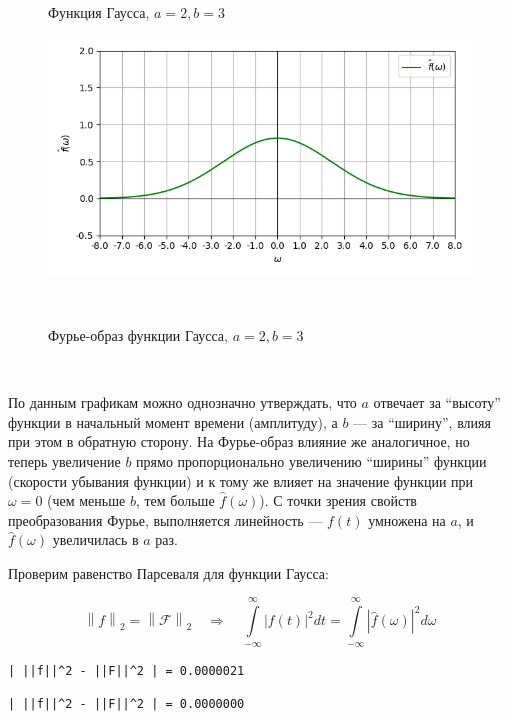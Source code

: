 \documentclass[a4paper]{article}
\let\oldint\int
\def\int{\oldint\limits}
\begin{document}
\begin{figure}[H]
\begin{minipage}{0.5\textwidth}
        \caption{Функция Гаусса, $a = 2, b = 3$}
    \end{minipage}\hfill
    \begin{minipage}{0.5\textwidth}
        \centering \includegraphics[width=\textwidth]{gaussian/real_fourier_2_3.png}
        \caption{Фурье-образ функции Гаусса, $a = 2, b = 3$}
    \end{minipage}\\[1em]
\end{figure}\noindent\

По данным графикам можно однозначно утверждать, что $a$ отвечает за ``высоту'' функции в начальный момент времени (амплитуду), а $b$ --- за ``ширину'', влияя при этом в обратную сторону. На Фурье-образ влияние же аналогичное, но теперь увеличение $b$ прямо пропорционально увеличению ``ширины'' функции (скорости убывания функции) и к тому же влияет на значение функции при $\omega=0$ (чем меньше $b$, тем больше $\hat{f}(\omega)$). С точки зрения свойств преобразования Фурье, выполняется линейность --- $f(t)$ умножена на $a$, и $\hat{f}(\omega)$ увеличилась в $a$ раз.\

Проверим равенство Парсеваля для функции Гаусса:

$$\left\lVert f \right\rVert _2 = \left\lVert \mathcal{F} \right\rVert _2 \quad\Rightarrow\quad \int_{-\infty}^{\infty}\left\lvert f(t)\right\rvert^2dt = \int_{-\infty}^{\infty}\left\lvert \hat{f}(\omega)\right\rvert^2d\omega$$

\begin{lstlisting}[caption={Равенство Парсеваля при $a = 1, b = 1$}, numbers=none]
| ||f||^2 - ||F||^2 | = 0.0000021
\end{lstlisting}

\begin{lstlisting}[caption={Равенство Парсеваля при $a = 1, b = 3$}, numbers=none]
| ||f||^2 - ||F||^2 | = 0.0000000
\end{lstlisting}
\end{document}
